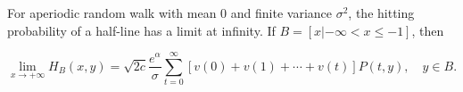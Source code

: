 For aperiodic random walk with mean 0 and finite variance $\sigma^2$, the hitting probability of a half-line has a limit at infinity. If $B = [x | -\infty < x \leq -1]$, then

$$\lim_{x \to +\infty} H_B(x,y) = \sqrt{2c} \frac{e^\alpha}{\sigma} \sum_{t=0}^{\infty} [v(0) + v(1) + \cdots + v(t)]P(t,y), \quad y \in B.$$